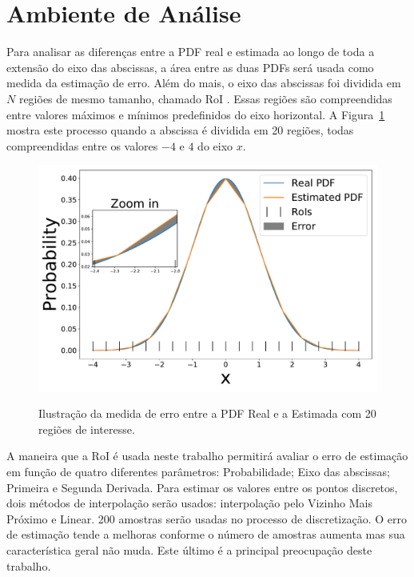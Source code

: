 \section{Ambiente de Análise}

Para analisar as diferenças entre a \ac{PDF} real e estimada ao longo de toda a extensão do eixo das abscissas, a área entre as duas \ac{PDF}s será usada como medida da estimação de erro. Além do mais, o eixo das abscissas foi dividida em $N$ regiões de mesmo tamanho, chamado \ac{RoI} \cite{ron1999art}. Essas regiões são compreendidas entre valores máximos e mínimos predefinidos do eixo horizontal. A Figura~\ref{fig:error} mostra este processo quando a abscissa é dividida em 20 regiões, todas compreendidas entre os valores $-4$ e $4$ do eixo $ x $.


\begin{figure}[!ht]
	\centering
	\includegraphics[width=0.6\linewidth]{./figuras/error1}\\
	\caption{Ilustração da medida de erro entre a PDF Real e a Estimada com 20 regiões de interesse.}
	\label{fig:error}
\end{figure}


A maneira que a \ac{RoI} é usada neste trabalho permitirá avaliar o erro de estimação em função de quatro diferentes parâmetros: Probabilidade; Eixo das abscissas; Primeira e Segunda Derivada. Para estimar os valores entre os pontos discretos, dois métodos de interpolação serão usados: interpolação pelo Vizinho Mais Próximo e Linear. 200 amostras serão usadas no processo de discretização. O erro de estimação tende a melhoras conforme o número de amostras aumenta mas sua característica geral não muda. Este último é a principal preocupação deste trabalho. 
